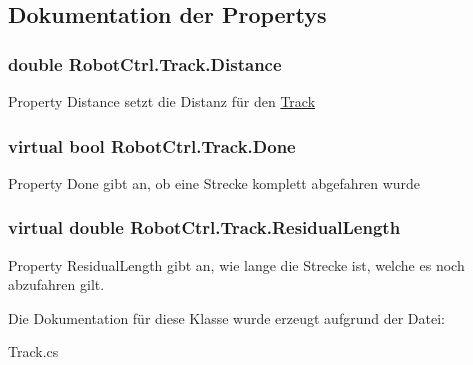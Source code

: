 \subsection{Dokumentation der Propertys}
\hypertarget{class_robot_ctrl_1_1_track_a42bb46c8d3c2a540b1d3d25e65b1a07c}{
\subsubsection[{Distance}]{\setlength{\rightskip}{0pt plus 5cm}double RobotCtrl.Track.Distance}}
\label{class_robot_ctrl_1_1_track_a42bb46c8d3c2a540b1d3d25e65b1a07c}
Property Distance setzt die Distanz f\"{u}r den \hyperlink{class_robot_ctrl_1_1_track}{Track} \hypertarget{class_robot_ctrl_1_1_track_ad1c4864f7171475914ef5c0111a0d901}{
\subsubsection[{Done}]{\setlength{\rightskip}{0pt plus 5cm}virtual bool RobotCtrl.Track.Done}}
\label{class_robot_ctrl_1_1_track_ad1c4864f7171475914ef5c0111a0d901}
Property Done gibt an, ob eine Strecke komplett abgefahren wurde \hypertarget{class_robot_ctrl_1_1_track_a4f01da358c21733d43ac272d3fb549cc}{
\subsubsection[{ResidualLength}]{\setlength{\rightskip}{0pt plus 5cm}virtual double RobotCtrl.Track.ResidualLength}}
\label{class_robot_ctrl_1_1_track_a4f01da358c21733d43ac272d3fb549cc}
Property ResidualLength gibt an, wie lange die Strecke ist, welche es noch abzufahren gilt. 

Die Dokumentation für diese Klasse wurde erzeugt aufgrund der Datei:\begin{DoxyCompactItemize}
\item 
Track.cs\end{DoxyCompactItemize}
